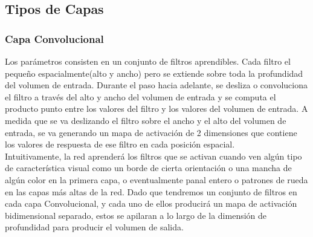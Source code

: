 \documentclass[a4paper,11pt,spanish]{book}
\begin{document}
    \subsection {Tipos de Capas}
      \subsubsection{Capa Convolucional}
	Los parámetros consisten en un conjunto de filtros aprendibles. Cada filtro el pequeño espacialmente(alto y ancho) pero se extiende sobre toda la profundidad del volumen de entrada.
	Durante el paso hacia adelante, se desliza o convoluciona el filtro a través del alto y ancho del volumen de entrada y se computa el producto punto entre los valores del filtro y los valores
	del volumen de entrada. A medida que se va deslizando el filtro sobre el ancho y el alto del volumen de entrada, se va generando un mapa de activación de 2 dimensiones que contiene los
	valores de respuesta de ese filtro en cada posición espacial.\\
	Intuitivamente, la red aprenderá los filtros que se activan cuando ven algún tipo de característica visual como un borde de cierta orientación o una mancha de algún color en la
	primera capa, o eventualmente panal entero o patrones de rueda en las capas más altas de la red. Dado que tendremos un conjunto de filtros en cada capa Convolucional,
	y cada uno de ellos producirá un mapa de activación bidimensional separado, estos se apilaran a lo largo de la dimensión de profundidad para producir el volumen de salida.\\
\end{document}
